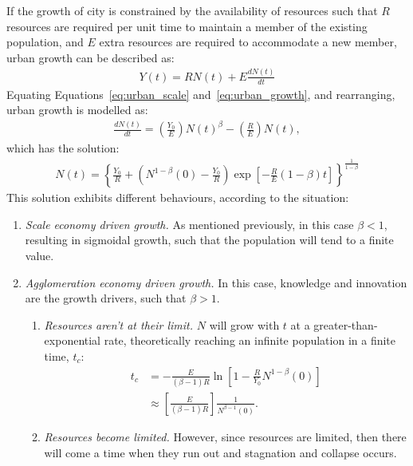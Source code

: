 If the growth of city is constrained by the availability of resources such that $R$ resources are required per unit time to maintain a member of the existing population, and $E$ extra resources are required to accommodate a new member, urban growth can be described as:
\begin{align} \label{eq:urban_growth}
	Y(t)=RN(t)+E\frac{dN(t)}{dt}
\end{align}
Equating Equations~\eqref{eq:urban_scale} and~\eqref{eq:urban_growth}, and rearranging, urban growth is modelled as:
\begin{align*}
	\frac{dN(t)}{dt}=\left(\frac{Y_0}{E}\right)N(t)^{\beta}-\left(\frac{R}{E}\right)N(t),
\end{align*}
which has the solution:
\begin{align*}
	N(t)=\left\{\frac{Y_0}{R}+\left(N^{1-\beta}(0)-\frac{Y_0}{R}\right)\exp\left[-\frac{R}{E}(1-\beta)t\right]\right\}^{\frac{1}{1-\beta}}
\end{align*}
This solution exhibits different behaviours, according to the situation:
\begin{enumerate}
	\item \emph{Scale economy driven growth.} As mentioned previously, in this case $\beta<1$, resulting in sigmoidal growth, such that the population will tend to a finite value.
	\item \label{itm:agglom} \emph{Agglomeration economy driven growth.} In this case, knowledge and innovation are the growth drivers, such that $\beta>1$.
	\begin{enumerate}
		\item \emph{Resources aren't at their limit.} $N$ will grow with $t$ at a greater-than-exponential rate, theoretically reaching an infinite population in a finite time, $t_c$:
\begin{align*}
	t_c&=-\frac{E}{(\beta-1)R}\ln\left[1-\frac{R}{Y_0}N^{1-\beta}(0)\right] \\
	&\approx \left[\frac{E}{(\beta-1)R}\right]\frac{1}{N^{\beta-1}(0)}.
\end{align*}
		\item \label{itm:collapse} \emph{Resources become limited.} However, since resources are limited, then there will come a time when they run out and stagnation and collapse occurs. 
	\end{enumerate}
\end{enumerate}

